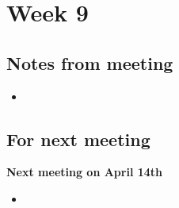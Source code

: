 
\section{Week 9}

\subsection{Notes from meeting}

\begin{itemize}
\item
\end{itemize}

\subsection{For next meeting}

\textbf{Next meeting on April 14th}

\begin{itemize}
\item
\end{itemize}
